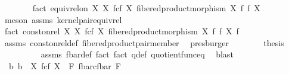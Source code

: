 \begin{isabellebody}
\ \ \ \ \ \ \isamarkupfalse%
\ fact{}{\isacharcolon}{\kern0pt}\ {\isachardoublequoteopen}equiv{\isacharunderscore}{\kern0pt}rel{\isacharunderscore}{\kern0pt}on\ X\ {\isacharparenleft}{\kern0pt}X\ \isactrlbsub f\isactrlesub {\isasymtimes}\isactrlsub c\isactrlbsub f\isactrlesub \ X{\isacharcomma}{\kern0pt}\ fibered{\isacharunderscore}{\kern0pt}product{\isacharunderscore}{\kern0pt}morphism\ X\ f\ f\ X{\isacharparenright}{\kern0pt}{\isachardoublequoteclose}\isanewline
\ \ \ \ \ \ \ \ \isamarkupfalse%
\ {\isacharparenleft}{\kern0pt}meson\ assms{\isacharparenleft}{\kern0pt}{}{\isacharparenright}{\kern0pt}\ kernel{\isacharunderscore}{\kern0pt}pair{\isacharunderscore}{\kern0pt}equiv{\isacharunderscore}{\kern0pt}rel{\isacharparenright}{\kern0pt}\isanewline
\isanewline
\ \ \ \ \ \ \isamarkupfalse%
\ fact{}{\isacharcolon}{\kern0pt}\ {\isachardoublequoteopen}const{\isacharunderscore}{\kern0pt}on{\isacharunderscore}{\kern0pt}rel\ X\ {\isacharparenleft}{\kern0pt}X\ \isactrlbsub f\isactrlesub {\isasymtimes}\isactrlsub c\isactrlbsub f\isactrlesub \ X{\isacharcomma}{\kern0pt}\ fibered{\isacharunderscore}{\kern0pt}product{\isacharunderscore}{\kern0pt}morphism\ X\ f\ f\ X{\isacharparenright}{\kern0pt}\ f{\isachardoublequoteclose}\isanewline
\ \ \ \ \ \ \ \ \isamarkupfalse%
\ assms{\isacharparenleft}{\kern0pt}{}{\isacharparenright}{\kern0pt}\ const{\isacharunderscore}{\kern0pt}on{\isacharunderscore}{\kern0pt}rel{\isacharunderscore}{\kern0pt}def\ fibered{\isacharunderscore}{\kern0pt}product{\isacharunderscore}{\kern0pt}pair{\isacharunderscore}{\kern0pt}member\ \isamarkupfalse%
\ presburger\isanewline
\ \ \ \ \ \ \isamarkupfalse%
\ {\isacharquery}{\kern0pt}thesis\isanewline
\ \ \ \ \ \ \ \ \isamarkupfalse%
\ assms{\isacharparenleft}{\kern0pt}{}{\isacharparenright}{\kern0pt}\ f{\isacharunderscore}{\kern0pt}bar{\isacharunderscore}{\kern0pt}def\ fact{}\ fact{}\ q{\isacharunderscore}{\kern0pt}def\ quotient{\isacharunderscore}{\kern0pt}func{\isacharunderscore}{\kern0pt}eq\ \isamarkupfalse%
\ blast\isanewline
\ \ \isamarkupfalse%
\isanewline
\isanewline
\ \ \isamarkupfalse%
\ {\isachardoublequoteopen}{\isasymexists}{\isacharbang}{\kern0pt}\ b{\isachardot}{\kern0pt}\ b\ {\isacharcolon}{\kern0pt}\ X\ \isactrlbsub f\isactrlesub {\isasymtimes}\isactrlsub c\isactrlbsub f\isactrlesub \ X\ {\isasymrightarrow}\ F\ \isactrlbsub {\isacharparenleft}{\kern0pt}f{\isacharunderscore}{\kern0pt}bar{\isacharparenright}{\kern0pt}\isactrlesub {\isasymtimes}\isactrlsub c\isactrlbsub {\isacharparenleft}{\kern0pt}f{\isacharunderscore}{\kern0pt}bar{\isacharparenright}{\kern0pt}\isactrlesub \ F\ {\isasymand}\isanewline

\end{isabellebody}
